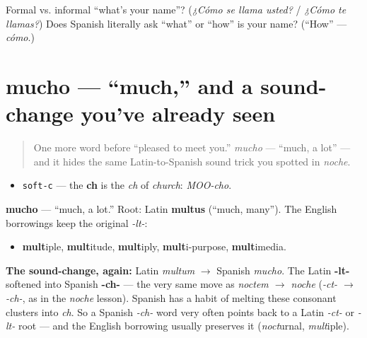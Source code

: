 \begin{tcolorbox}[breakable,colback=teal!4,colframe=teal!35!black,title={Before you move on}]
Formal vs. informal \textquotedblleft{}what's your name\textquotedblright{}? (\emph{¿Cómo se llama usted?} / \emph{¿Cómo te llamas?}) Does Spanish literally ask \textquotedblleft{}what\textquotedblright{} or \textquotedblleft{}how\textquotedblright{} is your name? (\textquotedblleft{}How\textquotedblright{} — \emph{cómo}.)
\end{tcolorbox}
\section[mucho]{mucho — \textquotedblleft{}much,\textquotedblright{} and a sound-change you've already seen}

\label{lesson:ES-C03-mucho}



\begin{quote}
One more word before \textquotedblleft{}pleased to meet you.\textquotedblright{} \emph{mucho} — \textquotedblleft{}much, a lot\textquotedblright{} — and it hides the same Latin-to-Spanish sound trick you spotted in \emph{noche}.
\end{quote}

\begin{sounds}
\begin{itemize}
\raggedright
  \item \texttt{soft-c} — the \textbf{ch} is the \emph{ch} of \emph{church}: \emph{MOO-cho}.
\end{itemize}
\end{sounds}

\begin{cousinweb}
\textbf{mucho} — \textquotedblleft{}much, a lot.\textquotedblright{} Root: Latin \textbf{multus} (\textquotedblleft{}much, many\textquotedblright{}). The English borrowings keep the original \emph{-lt-}:

\begin{itemize}
\raggedright
  \item \textbf{mult}iple, \textbf{mult}itude, \textbf{mult}iply, \textbf{mult}i-purpose, \textbf{mult}imedia.
\end{itemize}

\textbf{The sound-change, again:} Latin \emph{multum} $\to$ Spanish \emph{mucho}. The Latin \textbf{-lt-} softened into Spanish \textbf{-ch-} — the very same move as \emph{noctem $\to$ noche} (\emph{-ct- $\to$ -ch-}, as in the \emph{noche} lesson). Spanish has a habit of melting these consonant clusters into \emph{ch}. So a Spanish \emph{-ch-} word very often points back to a Latin \emph{-ct-} or \emph{-lt-} root — and the English borrowing usually preserves it (\emph{noct}urnal, \emph{mult}iple).
\end{cousinweb}

